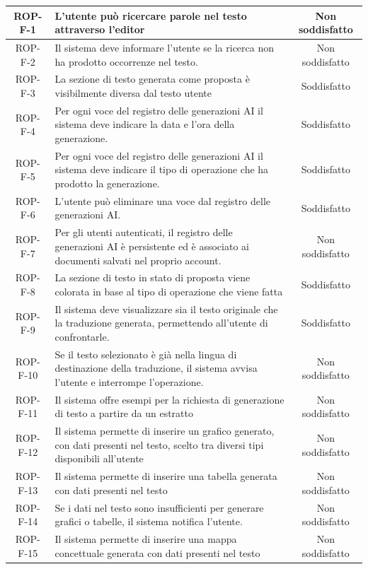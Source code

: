 \documentclass[11pt,a4paper]{article}
\begin{document}
\begin{longtable}{|c|p{11cm}|c|}
ROP-F-1 & L'utente può ricercare parole nel testo attraverso l'editor & Non soddisfatto \\
\hline
ROP-F-2 & Il sistema deve informare l'utente se la ricerca non ha prodotto occorrenze nel testo. & Non soddisfatto \\
\hline
ROP-F-3 & La sezione di testo generata come proposta è visibilmente diversa dal testo utente & Soddisfatto \\
\hline
ROP-F-4 & Per ogni voce del registro delle generazioni AI il sistema deve indicare la data e l'ora della generazione. & Soddisfatto \\
\hline
ROP-F-5 & Per ogni voce del registro delle generazioni AI il sistema deve indicare il tipo di operazione che ha prodotto la generazione. & Soddisfatto \\
\hline
ROP-F-6 & L'utente può eliminare una voce dal registro delle generazioni AI. & Soddisfatto \\
\hline
ROP-F-7 & Per gli utenti autenticati, il registro delle generazioni AI è persistente ed è associato ai documenti salvati nel proprio account. & Non soddisfatto \\
\hline
ROP-F-8 & La sezione di testo in stato di proposta viene colorata in base al tipo di operazione che viene fatta & Soddisfatto \\
\hline
ROP-F-9 & Il sistema deve visualizzare sia il testo originale che la traduzione generata, permettendo all'utente di confrontarle. & Soddisfatto \\
\hline
ROP-F-10 & Se il testo selezionato è già nella lingua di destinazione della traduzione, il sistema avvisa l'utente e interrompe l'operazione. & Non soddisfatto \\
\hline
ROP-F-11 & Il sistema offre esempi per la richiesta di generazione di testo a partire da un estratto & Non soddisfatto \\
\hline
ROP-F-12 & Il sistema permette di inserire un grafico generato, con dati presenti nel testo, scelto tra diversi tipi disponibili all'utente & Non soddisfatto \\
\hline
ROP-F-13 & Il sistema permette di inserire una tabella generata con dati presenti nel testo & Non soddisfatto \\
\hline
ROP-F-14 & Se i dati nel testo sono insufficienti per generare grafici o tabelle, il sistema notifica l'utente. & Non soddisfatto \\
\hline
ROP-F-15 & Il sistema permette di inserire una mappa concettuale generata con dati presenti nel testo & Non soddisfatto \\

\end{longtable}
\end{document}

